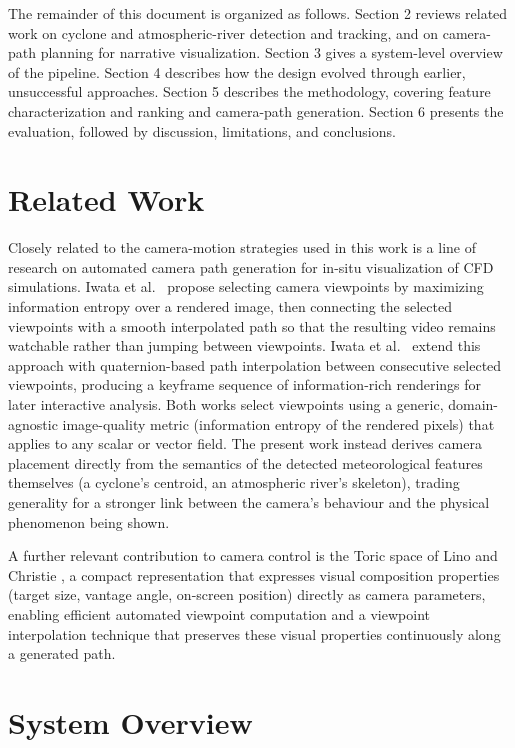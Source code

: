 \documentclass[journal abbreviation, manuscript]{copernicus}
\begin{document}
The remainder of this document is organized as follows. Section 2
reviews related work on cyclone and atmospheric-river detection and
tracking, and on camera-path planning for narrative visualization.
Section 3 gives a system-level overview of the pipeline. Section 4
describes how the design evolved through earlier, unsuccessful
approaches. Section 5 describes the methodology, covering feature
characterization and ranking and camera-path generation. Section 6
presents the evaluation, followed by discussion, limitations, and
conclusions.

\section{Related Work}
Closely related to the camera-motion strategies used in this work is a line of
research on automated camera path generation for in-situ visualization of CFD
simulations. Iwata et al.~\cite{iwata2023entropy} propose selecting camera
viewpoints by maximizing information entropy over a rendered image, then
connecting the selected viewpoints with a smooth interpolated path so that the
resulting video remains watchable rather than jumping between viewpoints.
Iwata et al.~\citep{iwata2025smart} extend this approach with quaternion-based
path interpolation between consecutive selected viewpoints, producing a
keyframe sequence of information-rich renderings for later interactive
analysis. Both works select viewpoints using a generic, domain-agnostic
image-quality metric (information entropy of the rendered pixels) that applies
to any scalar or vector field. The present work instead derives camera
placement directly from the semantics of the detected meteorological features
themselves (a cyclone's centroid, an atmospheric river's skeleton), trading
generality for a stronger link between the camera's behaviour and the
physical phenomenon being shown.

A further relevant contribution to camera control is the Toric space of Lino
and Christie \citep{lino2015toric}, a compact representation that expresses
visual composition properties (target size, vantage angle, on-screen position)
directly as camera parameters, enabling efficient automated viewpoint
computation and a viewpoint interpolation technique that preserves these
visual properties continuously along a generated path.

\section{System Overview}
\end{document}
